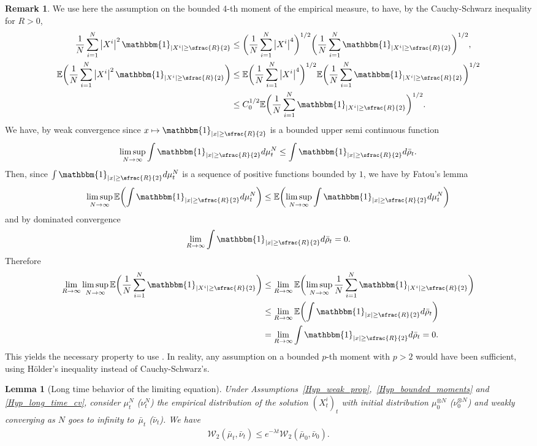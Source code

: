 \documentclass[10pt]{amsart}
\let\mathds\mathbbm
\newcommand\mto{\mathchoice{\longmapsto}{\mapsto}{\mapsto}{\mapsto}}
\theoremstyle{plain}
\newtheorem{lemma}{Lemma}[section]
\theoremstyle{definition}
\newtheorem{remark}{Remark}[section]
\begin{document}
\begin{remark}
We use here the assumption on the bounded 4-th moment of the empirical measure, to have, by the Cauchy-Schwarz inequality for $R>0$,
\begin{align*}
\frac{1}{N}\sum_{i=1}^N\left|X^i\right|^2\mathds{1}_{|X^i|\geq \sfrac{R}{2}}&\leq \biggl(\frac{1}{N}\sum_{i=1}^N\left|X^i\right|^{4}\biggr)^{1/2}\biggl(\frac{1}{N}\sum_{i=1}^N\mathds{1}_{|X^i|\geq \sfrac{R}{2}}\biggr)^{1/2},\\
\mathbb{E}\biggl(\frac{1}{N}\sum_{i=1}^N\left|X^i\right|^2\mathds{1}_{|X^i|\geq \sfrac{R}{2}}\biggr)&\leq \mathbb{E}\biggl(\frac{1}{N}\sum_{i=1}^N\left|X^i\right|^{4}\biggr)^{1/2}\mathbb{E}\biggl(\frac{1}{N}\sum_{i=1}^N\mathds{1}_{|X^i|\geq \sfrac{R}{2}}\biggr)^{1/2}\\
&\leq C_0^{1/2}\mathbb{E}\biggl(\frac{1}{N}\sum_{i=1}^N\mathds{1}_{|X^i|\geq \sfrac{R}{2}}\biggr)^{1/2}.
\end{align*}
We have, by weak convergence since $x\mto\mathds{1}_{|x|\geq \sfrac{R}{2}}$ is a bounded upper semi continuous function
\[
\limsup_{N\to\infty}\int\mathds{1}_{|x|\geq \sfrac{R}{2}}d\mu^N_t\leq\int\mathds{1}_{|x|\geq \sfrac{R}{2}}d\bar{\rho}_t.
\]
Then, since $\int\mathds{1}_{|x|\geq \sfrac{R}{2}}d\mu^N_t$ is a sequence of positive functions bounded by $1$, we have by Fatou's lemma
\[
\limsup_{N\to\infty}\mathbb{E}\biggl(\int\mathds{1}_{|x|\geq \sfrac{R}{2}}d\mu^N_t\biggr)\leq\mathbb{E}\biggl(\limsup_{N\to\infty}\int\mathds{1}_{|x|\geq \sfrac{R}{2}}d\mu^N_t\biggr)
\]
and by dominated convergence
\[
\lim_{R\to\infty}\int\mathds{1}_{|x|\geq \sfrac{R}{2}}d\bar{\rho}_t=0.
\]
Therefore
\begin{align*}
\lim_{R\to\infty}\limsup_{N\to\infty}\mathbb{E}\biggl(\frac{1}{N}\sum_{i=1}^N\mathds{1}_{|X^i|\geq \sfrac{R}{2}}\biggr)&\leq \lim_{R\to\infty}\mathbb{E}\biggl(\limsup_{N\to\infty}\frac{1}{N}\sum_{i=1}^N\mathds{1}_{|X^i|\geq \sfrac{R}{2}}\biggr)\\
&\leq \lim_{R\to\infty}\mathbb{E}\biggl(\int\mathds{1}_{|x|\geq \sfrac{R}{2}}d\bar{\rho}_t\biggr)\\
&=\lim_{R\to\infty}\int\mathds{1}_{|x|\geq \sfrac{R}{2}}d\bar{\rho}_t=0.
\end{align*}
This yields the necessary property to use \cite[Th.\,6.9]{villani2008optimal}. In reality, any assumption on a bounded $p$-th moment with $p>2$ would have been sufficient, using Hölder's inequality instead of Cauchy-Schwarz's.
\end{remark}

\begin{lemma}[Long time behavior of the limiting equation]
Under Assumptions~\ref{Hyp_weak_prop},~\ref{Hyp_bounded_moments} and \ref{Hyp_long_time_cv}, consider $\mu^N_t$ (\resp $\nu^N_t$) the empirical distribution of the solution $(X^i_t)_t$ with initial distribution $\mu_0^{\otimes N}$ (\resp $\nu_0^{\otimes N}$) and weakly converging as $N$ goes to infinity to~$\bar{\mu}_t$ (\resp $\bar{\nu}_t$). We have
\begin{align*}
\mathcal{W}_2\left(\bar{\mu}_t, \bar{\nu}_t\right)\leq e^{-\lambda t}\mathcal{W}_2(\bar{\mu}_0, \bar{\nu}_0).
\end{align*}
\end{lemma}
\end{document}
